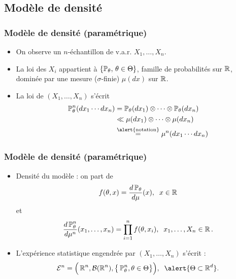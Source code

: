 \subsection{Modèle de densité}

\begin{frame}
\frametitle{Modèle de densité (paramétrique)}
\begin{itemize}
\item On observe un $n$-échantillon de v.a.r. $X_1,\ldots, X_n$.
\item La loi des $X_i$ appartient à
$\{\operatorname{{\mathbb P}}_\theta,\,\theta \in \Theta\}$, famille de \alert{probabilités sur $\operatorname{{\mathbb R}}$}, \alert{dominée} par une mesure ($\sigma$-finie) $\mu(dx)$ sur $\operatorname{{\mathbb R}}$.
\item La loi de $(X_1,\ldots,X_n)$ s'écrit
\begin{align*}
\PP_\theta^n(dx_1\cdots dx_n) & = \PP_\theta(dx_1)\otimes \cdots \otimes \PP_\theta(dx_n) \\
& \ll  \mu(dx_1)\otimes \cdots \otimes \mu(dx_n) \\
& \stackrel{\text{\alert{notation}}}{=} \mu^n(dx_1\cdots dx_n)
\end{align*}
\end{itemize}
\end{frame}

\begin{frame}
\frametitle{Modèle de densité (paramétrique)}
\begin{itemize}
\item \alert{Densité du modèle} : on part de
$$f(\theta,x)=\frac{d\operatorname{{\mathbb P}}_\theta}{d\mu}(x),\;\;x\in \operatorname{{\mathbb R}}$$
et
$$\frac{d\operatorname{{\mathbb P}}_\theta^n}{d\mu^{n}}(x_1,\ldots, x_n) = \prod_{i = 1}^n f(\theta,x_i),\;\;x_1,\ldots, X_n \in \operatorname{{\mathbb R}}.$$
\item  \alert{L'expérience statistique} engendrée par $(X_1,\ldots, X_n)$ s'écrit :
$${\mathcal E}^n = \Big(\R^n, {\mathcal B}(\R^n), \big\{\PP_\theta^n,\theta \in \Theta\big\}\Big),\;\;\alert{\Theta \subset \R^d}.$$
\end{itemize}
\end{frame}

